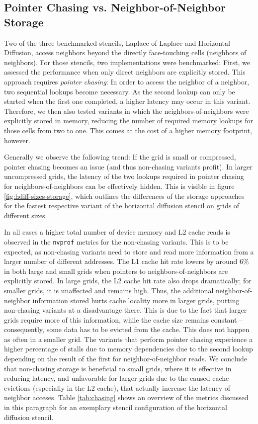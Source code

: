 \subsection{Pointer Chasing vs. Neighbor-of-Neighbor Storage}
\label{sec:results-chasing}

Two of the three benchmarked stencils, Laplace-of-Laplace and Horizontal Diffusion, access neighbors beyond the directly face-touching cells (neighbors of neighbors). For those stencils, two implementations were benchmarked: First, we assessed the performance when only direct neighbors are explicitly stored. This approach requires \emph{pointer chasing}: In order to access the neighbor of a neighbor, two sequential lookups become necessary. As the second lookup can only be started when the first one completed, a higher latency may occur in this variant. Therefore, we then also tested variants in which the neighbors-of-neighbors were explicitly stored in memory, reducing the number of required memory lookups for those cells from two to one. This comes at the cost of a higher memory footprint, however.

Generally we observe the following trend: If the grid is small or compressed, pointer chasing becomes an issue (and thus non-chasing variants profit). In larger uncompressed grids, the latency of the two lookups required in pointer chasing for neighbors-of-neighbors can be effectively hidden. This is visible in figure \ref{fig:hdiff-sizes-storage}, which outlines the differences of the storage approaches for the fastest respective variant of the horizontal diffusion stencil on grids of different sizes. 

In all cases a higher total number of device memory and L2 cache reads is observed in the \texttt{nvprof} metrics for the non-chasing variants. This is to be expected, as non-chasing variants need to store and read more information from a larger number of different addresses. The L1 cache hit rate lowers by around $6\%$ in both large and small grids when pointers to neighbors-of-neighbors are explicitly stored. In large grids, the L2 cache hit rate also drops dramatically; for smaller grids, it is unaffected and remains high. Thus, the additional neighbor-of-neighbor information stored hurts cache locality more in larger grids, putting non-chasing variants at a disadvantage there. This is due to the fact that larger grids require more of this information, while the cache size remains constant -- consequently, some data has to be evicted from the cache. This does not happen as often in a smaller grid. The variants that perform pointer chasing experience a higher percentage of stalls due to memory dependencies due to the second lookup depending on the result of the first for neighbor-of-neighbor reads.  We conclude that non-chasing storage is beneficial to small grids, where it is effective in reducing latency, and unfavorable for larger grids due to the caused cache evictions (especially in the L2 cache), that actually increase the latency of neighbor acceses. Table \ref{tab:chasing} shows an overview of the metrics discussed in this paragraph for an exemplary stencil configuration of the horizontal diffusion stencil.

